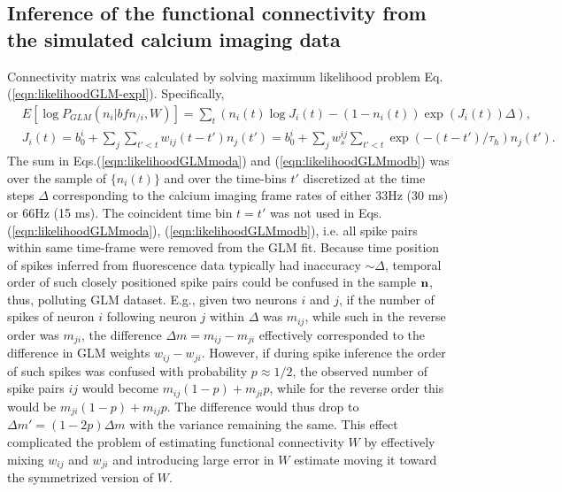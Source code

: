 \documentclass[amsmath,amssymb]{revtex4}
\begin{document}
\subsection{\label{sec:results:inference}Inference of the functional connectivity from the simulated calcium imaging data}
Connectivity matrix was calculated by solving maximum likelihood problem Eq.(\ref{eqn:likelihoodGLM-expl}). Specifically,
\begin{align}
\label{eqn:likelihoodGLMmoda}&E[\log P_{GLM}(n_i|{bf n}_{/i},W)]=\sum_t \left( n_i(t) \log J_i(t) - (1-n_i(t)) \exp(J_i(t)) \Delta \right),\\
\label{eqn:likelihoodGLMmodb}&J_i(t)=b_0^i+\sum\limits_j \sum\limits_{t'<t} w_{ij}(t-t')n_{j}(t')=
b_0^i+\sum\limits_j w^{ij}_s \sum\limits_{t'<t} \exp(-(t-t')/\tau_h)n_j(t').
\end{align}
The sum in Eqs.(\ref{eqn:likelihoodGLMmoda}) and (\ref{eqn:likelihoodGLMmodb}) was over the sample of $\{n_i(t)\}$ and over the time-bins $t'$ discretized at the time steps $\Delta$ corresponding to the calcium imaging frame rates of either 33Hz (30 ms) or 66Hz (15 ms). The coincident time bin $t=t'$ was not used in Eqs.(\ref{eqn:likelihoodGLMmoda}), (\ref{eqn:likelihoodGLMmodb}), i.e.
all spike pairs within same time-frame were removed from the GLM fit.
Because time position of spikes inferred from fluorescence data typically had inaccuracy $\sim \Delta$, temporal order of such closely positioned spike pairs could be confused in the sample ${\bf n}$, thus, polluting GLM dataset.
E.g., given two neurons $i$ and $j$, if the number of spikes of neuron $i$ following neuron $j$ within $\Delta$ was $m_{ij}$, while such in the reverse order was $m_{ji}$, the difference $\Delta m = m_{ij}-m_{ji}$ effectively corresponded to the difference in GLM weights $w_{ij}-w_{ji}$. However, if during spike inference the order of such spikes was confused with probability $p\approx 1/2$, the observed number of spike pairs $ij$ would become $m_{ij}(1-p)+m_{ji}p$, while for the reverse order this would be $m_{ji}(1-p)+m_{ij}p$. The difference would thus drop to $\Delta m '= (1-2p)\Delta m$ with the variance remaining the same. This effect complicated the problem of estimating functional connectivity $W$ by effectively mixing $w_{ij}$ and $w_{ji}$ and introducing large error in $W$ estimate moving it toward the symmetrized version of $W$.
\end{document}
